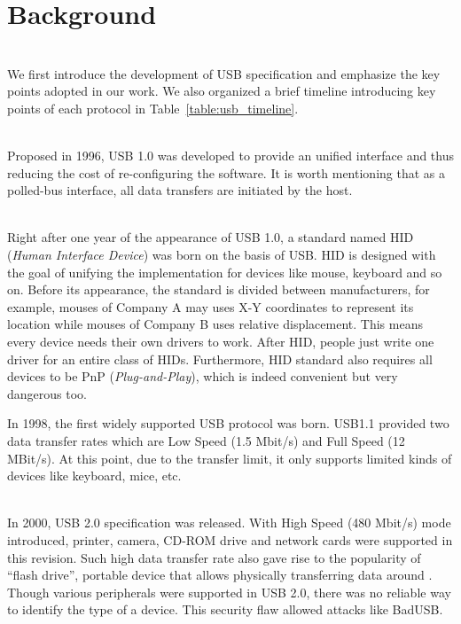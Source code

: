 \section{Background}
\label{sec:background}
\noindent{}\\
We first introduce the development of USB specification and emphasize the key points adopted in our work. We also organized a brief timeline introducing key points of each protocol in Table~\ref{table:usb_timeline}.

\noindent{}\\
Proposed in 1996, USB 1.0\cite{usb10} was developed to provide an unified interface and thus reducing the cost of re-configuring the software. It is worth mentioning that as a polled-bus interface, all data transfers are initiated by the host.

\noindent{}\\
Right after one year of the appearance of USB 1.0, a standard named HID (\emph{Human Interface Device}) was born on the basis of USB. HID is designed with the goal of unifying the implementation for devices like mouse, keyboard and so on. Before its appearance, the standard is divided between manufacturers, for example, mouses of Company A may uses X-Y coordinates to represent its location while mouses of Company B uses relative displacement. This means every device needs their own drivers to work. After HID, people just write one driver for an entire class of HIDs. Furthermore, HID standard also requires all devices to be PnP (\emph{Plug-and-Play}), which is indeed convenient but very dangerous too. 

In 1998, the first widely supported USB protocol was born. USB1.1\cite{usb11} provided two data transfer rates which are Low Speed (1.5 Mbit/s) and Full Speed (12 MBit/s). At this point, due to the transfer limit, it only supports limited kinds of devices like keyboard, mice, etc.

\noindent{}\\
In 2000, USB 2.0\cite{usb20} specification was released. With High Speed (480 Mbit/s) mode introduced, printer, camera, CD-ROM drive and network cards were supported in this revision. Such high data transfer rate also gave rise to the popularity of ``flash drive'', portable device that allows physically transferring data around \cite{sok}. Though various peripherals were supported in USB 2.0, there was no reliable way to identify the type of a device. This security flaw allowed attacks like BadUSB\cite{rubber}.


